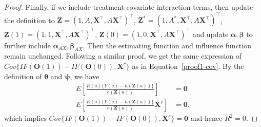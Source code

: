 \documentclass[12pt]{article}
\newcommand{\bX}{\boldsymbol{X}}
\newcommand{\bO}{\boldsymbol{O}}
\newcommand{\bZ}{\boldsymbol{Z}}
\newcommand{\bzero}{\boldsymbol{0}}
\newcommand{\balpha}{\boldsymbol{\alpha}}
\newcommand{\bbeta}{\boldsymbol{\beta}}
\newcommand{\btheta}{\boldsymbol{\theta}}
\newcommand{\bpsi}{\boldsymbol{\psi}}
\begin{document}
\begin{proof}
Finally, if we include treatment-covariate interaction terms, then update the definition to $\bZ = (1, A, \bX^\top, A\bX^\top)^\top$, $\bZ^* = (1, A^*, \bX^\top, A\bX^\top)^\top$, $\bZ(1) = (1, 1, \bX^\top, A\bX^\top)^\top$, $\bZ(0) = (1, 0, \bX^\top, A\bX^\top)^\top$ and update $\balpha, \bbeta$ to further include $\balpha_{AX}, \bbeta_{AX}$. Then the estimating function and influence function remain unchanged. Following a similar proof, we get the same expression of $Cov\{IF(\bO(1)) - IF(\bO(0)), \bX^r\}$ as in Equation~\eqref{proof1-cov}. By the definition of $\underline{\btheta}$ and $\bpsi$, we have
\begin{align*}
    E\left[\frac{R(a)\{Y(a)-h(\bZ(a))\}}{ e(\bZ(a))}\right] &= \bzero \\
    E\left[\frac{R(a)\{Y(a)-h(\bZ(a))\}}{ e(\bZ(a))}\bX^r\right] &= \bzero,
\end{align*}
which implies $ Cov\{IF(\bO(1)) - IF(\bO(0)), \bX^r\} = \bzero$ and hence $R^2=0$.
\end{proof}
\end{document}
